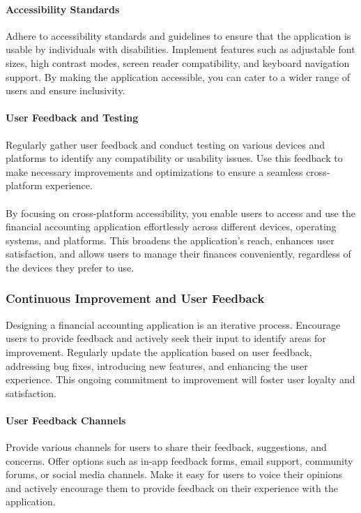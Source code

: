 \paragraph{Accessibility Standards}
Adhere to accessibility standards and guidelines to ensure that the application is usable by individuals with 
disabilities. Implement features such as adjustable font sizes, high contrast modes, screen reader compatibility, 
and keyboard navigation support. By making the application accessible, you can cater to a wider range of users 
and ensure inclusivity.

\paragraph{User Feedback and Testing}
Regularly gather user feedback and conduct testing on various devices and platforms to identify any compatibility 
or usability issues. Use this feedback to make necessary improvements and optimizations to ensure a seamless 
cross-platform experience.
\\
\\
By focusing on cross-platform accessibility, you enable users to access and use the financial accounting application 
effortlessly across different devices, operating systems, and platforms. This broadens the application's reach, 
enhances user satisfaction, and allows users to manage their finances conveniently, regardless of the devices they 
prefer to use.


\subsubsection{Continuous Improvement and User Feedback}
Designing a financial accounting application is an iterative process. Encourage users to provide feedback and 
actively seek their input to identify areas for improvement. Regularly update the application based on user 
feedback, addressing bug fixes, introducing new features, and enhancing the user experience. This ongoing 
commitment to improvement will foster user loyalty and satisfaction.

\paragraph{User Feedback Channels}
Provide various channels for users to share their feedback, suggestions, and concerns. Offer options such as in-app 
feedback forms, email support, community forums, or social media channels. Make it easy for users to voice their 
opinions and actively encourage them to provide feedback on their experience with the application.

